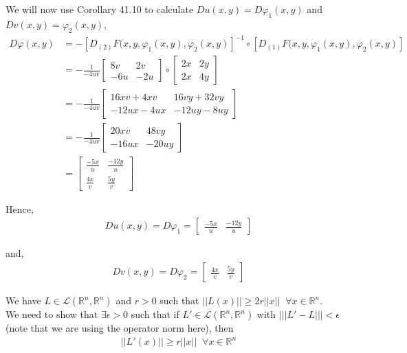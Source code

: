 \documentclass[12pt]{article}
\newenvironment{problem}[2][Problem]{\begin{trivlist}
\item[\hskip \labelsep {\bfseries #1}\hskip \labelsep {\bfseries #2.}]}{\end{trivlist}}
\begin{document}
We will now use Corollary 41.10 to calculate $Du(x, y) = D\varphi_1(x, y)$ and $Dv(x, y) = \varphi_2(x, y)$,
\begin{align*}
D\varphi(x, y) &= -[D_{(2)} F(x, y, \varphi_1(x,y), \varphi_2(x,y)]^{-1} \circ [D_{(1)} F(x, y, \varphi_1(x,y), \varphi_2(x,y)]\\
&= -\frac{1}{-4uv} \begin{bmatrix}
8v & 2v\\
-6u & -2u
\end{bmatrix} \circ \begin{bmatrix}
2x & 2y\\
2x & 4y
\end{bmatrix}\\
&= -\frac{1}{-4uv} \begin{bmatrix}
16xv + 4xv & 16vy + 32vy\\
-12ux - 4ux & -12uy - 8uy
\end{bmatrix}\\
&= -\frac{1}{-4uv} \begin{bmatrix}
20xv & 48vy\\
-16ux & -20uy
\end{bmatrix}\\
&= \begin{bmatrix}
\frac{-5x}{u} & \frac{-12y}{u}\\
\frac{4x}{v} & \frac{5y}{v}
\end{bmatrix}
\end{align*}

Hence, 
\begin{align*}
Du(x,y) = D\varphi_1 = \begin{bmatrix}
\frac{-5x}{u} & \frac{-12y}{u}
\end{bmatrix}
\end{align*}

and,
\begin{align*}
Dv(x,y) = D\varphi_2 = \begin{bmatrix}
\frac{4x}{v} & \frac{5y}{v}
\end{bmatrix}
\end{align*}

\begin{problem}{5}
\end{problem}

We have $L \in \mathscr{L}(\mathbb{R}^n, \mathbb{R}^n)$ and $r > 0$ such that $||L(x)|| \geq 2r ||x|| \; \; \forall x \in \mathbb{R}^n$.\\

We need to show that $\exists \epsilon >0$ such that if $L' \in \mathscr{L}(\mathbb{R}^n, \mathbb{R}^n)$ with $|||L' - L||| < \epsilon$ (note that we are using the operator norm here), then
\begin{align}
||L'(x)|| \geq r||x|| \; \; \forall x \in \mathbb{R}^n
\end{align}
\end{document}
